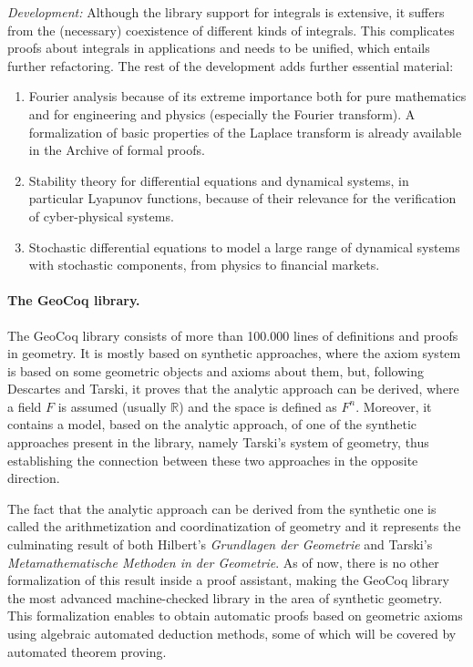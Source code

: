 \emph{Development:}
Although the library support for integrals is extensive, it suffers
from the (necessary) coexistence of different kinds of
integrals. This complicates proofs about integrals in applications and needs
to be unified, which entails further refactoring. The rest of the
development adds further essential material:
\begin{enumerate}
  \item Fourier analysis because of its extreme importance both for pure mathematics and for
engineering and physics (especially the Fourier
transform). A formalization of basic properties of the Laplace transform is already available in the Archive of formal proofs.
\item Stability theory for differential equations and
dynamical systems, in particular Lyapunov functions, because of their
relevance for the verification of cyber-physical systems.
\item Stochastic differential equations to model a large range of
dynamical systems with stochastic components, from physics to financial markets.
\end{enumerate}

\paragraph*{The GeoCoq library.}
The GeoCoq library consists of more than 100.000 lines of definitions
and proofs in geometry. It is mostly based on synthetic approaches,
where the axiom system is based on some geometric objects and axioms
about them, but, following Descartes and Tarski, it proves that the
analytic approach can be derived, where a field $F$ is assumed
(usually $\mathbb{R}$) and the space is defined as $F^n$. Moreover, it
contains a model, based on the analytic approach, of one of the
synthetic approaches present in the library, namely Tarski's system of
geometry, thus establishing the connection between these two
approaches in the opposite direction.

The fact that the analytic approach can be derived from the synthetic
one is called the arithmetization and coordinatization of geometry and
it represents the culminating result of both Hilbert's {\em Grundlagen der
Geometrie} and Tarski's {\em Metamathematische Methoden in der
Geometrie}. As of now, there is no other formalization of this result
inside a proof assistant, making the GeoCoq library the most advanced
machine-checked library in the area of synthetic geometry. This
formalization enables to obtain automatic proofs based on geometric
axioms using algebraic automated deduction methods, some of which will
be covered by automated theorem proving.

